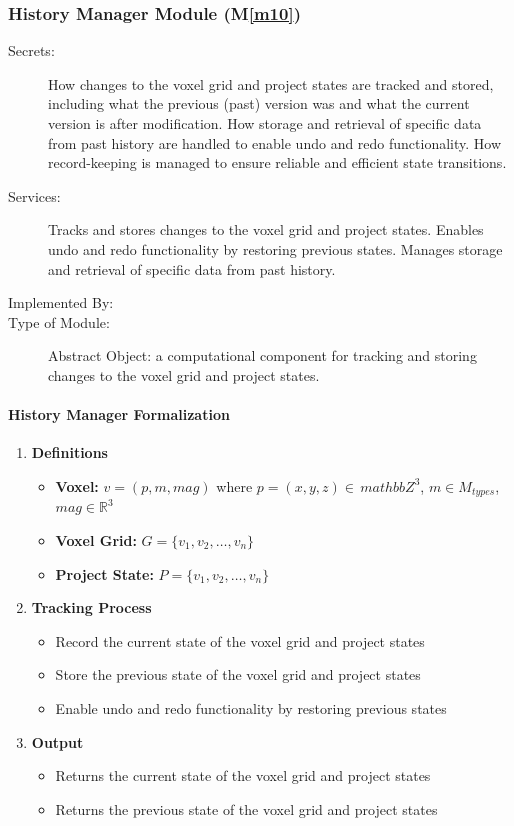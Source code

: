 \documentclass[12pt, titlepage]{article}
\newcommand{\mref}[1]{M\ref{#1}}
\begin{document}
\subsubsection{History Manager Module (\mref{m10})}

\begin{description}
\item[Secrets:] How changes to the voxel grid and project states are tracked and stored, including what the previous (past) version was and what the current version is after modification. How storage and retrieval of specific data from past history are handled to enable undo and redo functionality. How record-keeping is managed to ensure reliable and efficient state transitions.
\item[Services:] Tracks and stores changes to the voxel grid and project states. Enables undo and redo functionality by restoring previous states. Manages storage and retrieval of specific data from past history.
\item[Implemented By:] \progname{}
\item[Type of Module:] Abstract Object: a computational component for tracking and storing changes to the voxel grid and project states.
\end{description}

\iffalse
\paragraph{History Manager Formalization}

\begin{enumerate}
\item \textbf{Definitions}
\begin{itemize}
\item \textbf{Voxel:} $v = (p, m, mag)$ where $p=(x,y,z)\in\,mathbb{Z}^3$, $m\in M_{types}$, $mag\in\mathbb{R}^3$
\item \textbf{Voxel Grid:} $G=\{v_1,v_2,\ldots,v_n\}$
\item \textbf{Project State:} $P=\{v_1,v_2,\ldots,v_n\}$
\end{itemize}

\item \textbf{Tracking Process}
\begin{itemize}
\item Record the current state of the voxel grid and project states
\item Store the previous state of the voxel grid and project states
\item Enable undo and redo functionality by restoring previous states
\end{itemize}

\item \textbf{Output}
\begin{itemize}
\item Returns the current state of the voxel grid and project states
\item Returns the previous state of the voxel grid and project states
\end{itemize}
\end{enumerate}
\end{document}
